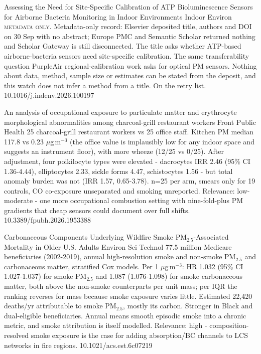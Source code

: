 \documentclass[10pt]{article}
\begin{document}
{Assessing the Need for Site-Specific Calibration of ATP Bioluminescence Sensors for Airborne Bacteria Monitoring in Indoor Environments}
{Indoor Environ}
{\textsc{metadata only.} Metadata-only record: Elsevier deposited title, authors and DOI on 30 Sep with no abstract; Europe PMC and Semantic Scholar returned nothing and Scholar Gateway is still disconnected. The title asks whether ATP-based airborne-bacteria sensors need site-specific calibration. The same transferability question PurpleAir regional-calibration work asks for optical PM sensors. Nothing about data, method, sample size or estimates can be stated from the deposit, and this watch does not infer a method from a title. On the retry list.}
{10.1016/j.indenv.2026.100197}

\par{}\baselineskip{}\baselineskip
{}

{An analysis of occupational exposure to particulate matter and erythrocyte morphological abnormalities among charcoal-grill restaurant workers}
{Front Public Health}
{25 charcoal-grill restaurant workers vs 25 office staff. Kitchen PM median 117.8 vs 0.23 $\mu$g\,m$^{-3}$ (the office value is implausibly low for any indoor space and suggests an instrument floor), with more wheeze (12/25 vs 0/25). After adjustment, four poikilocyte types were elevated - dacrocytes IRR 2.46 (95\% CI 1.36-4.44), elliptocytes 2.33, sickle forms 4.47, schistocytes 1.56 - but total anomaly burden was not (IRR 1.57, 0.65-3.78). n=25 per arm, smears only for 19 controls, CO co-exposure unseparated and smoking unreported. Relevance: low-moderate - one more occupational combustion setting with nine-fold-plus PM gradients that cheap sensors could document over full shifts.}
{10.3389/fpubh.2026.1953388}

\par{}\baselineskip{}\baselineskip
{}

{Carbonaceous Components Underlying Wildfire Smoke PM$_{2.5}$-Associated Mortality in Older U.S. Adults}
{Environ Sci Technol}
{77.5 million Medicare beneficiaries (2002-2019), annual high-resolution smoke and non-smoke PM$_{2.5}$ and carbonaceous matter, stratified Cox models. Per 1 $\mu$g\,m$^{-3}$: HR 1.032 (95\% CI 1.027-1.037) for smoke PM$_{2.5}$ and 1.087 (1.076-1.098) for smoke carbonaceous matter, both above the non-smoke counterparts per unit mass; per IQR the ranking reverses for mass because smoke exposure varies little. Estimated 22,420 deaths/yr attributable to smoke PM$_{2.5}$, mostly its carbon. Stronger in Black and dual-eligible beneficiaries. Annual means smooth episodic smoke into a chronic metric, and smoke attribution is itself modelled. Relevance: high - composition-resolved smoke exposure is the case for adding absorption/BC channels to LCS networks in fire regions.}
{10.1021/acs.est.6c07219}
\end{document}
